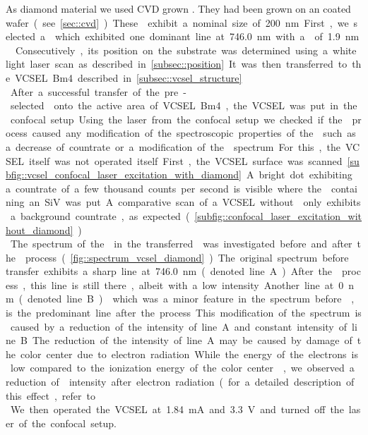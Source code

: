 	As diamond material we used CVD grown \nds.
	They had been grown on an \ir coated \si wafer (see \cref{sec::cvd}).
	These \nds exhibit a nominal size of \SI{200}{nm}.
	First, we selected a \nd which exhibited one dominant line at \SI{746.0}{nm} with a \lw of \SI{1.9}{nm}.
	Consecutively, its position on the substrate was determined using a white light laser scan as described in \cref{subsec::position}.
	It was then transferred to the VCSEL Bm4 described in \cref{subsec::vcsel_structure}.
	\\
	After a successful transfer of the pre-selected \nd onto the active area of VCSEL Bm4, the VCSEL was put in the confocal setup.
	Using the laser from the confocal setup we checked if the \pp process caused any modification of the spectroscopic properties of the \siv such as a decrease of countrate or a modification of the \fl spectrum.
	For this, the VCSEL itself was not operated itself.
	First, the VCSEL surface was scanned \cref{subfig::vcsel_confocal_laser_excitation_with_diamond}.
	.
	A bright dot exhibiting a countrate of a few thousand counts per second is visible where the \nd containing an SiV was put.
	A comparative scan of a VCSEL without \nd only exhibits a background countrate, as expected (\cref{subfig::confocal_laser_excitation_without_diamond}).
	\\
	The spectrum of the \siv in the transferred \nd was investigated before and after the \pp process (\cref{fig::spectrum_vcsel_diamond}).
	The original spectrum before \nd transfer exhibits a sharp line at \SI{746.0}{nm} (denoted line A).
	After the \pp process, this line is still there, albeit with a low intensity.
	Another line at \SI{0}{nm} (denoted line B)  which was a minor feature in the spectrum before \pp, is the predominant line after the process.
	This modification of the spectrum is caused by a reduction of the intensity of line A and constant intensity of line B.
	The reduction of the intensity of line A may be caused by damage of the color center due to electron radiation.
	While the energy of the electrons is low compared to the ionization energy of the color center , we observed a reduction of \fl intensity after electron radiation (for a detailed description of this effect, refer to \cite{alexmeyer::baccthesis}.
	\\
	We then operated the VCSEL at \SI{1.84}{mA} and \SI{3.3}{V} and turned off the laser of the confocal setup.
